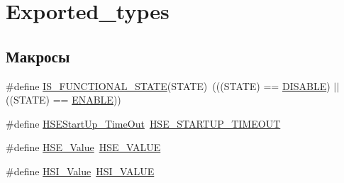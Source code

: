 \hypertarget{group___exported__types}{}\section{Exported\+\_\+types}
\label{group___exported__types}
\subsection*{Макросы}
\begin{DoxyCompactItemize}
\item 
\#define \mbox{\hyperlink{group___exported__types_gaffaf7c3f537d7a3370b1bbdda67a2bf6}{I\+S\+\_\+\+F\+U\+N\+C\+T\+I\+O\+N\+A\+L\+\_\+\+S\+T\+A\+TE}}(S\+T\+A\+TE)~(((S\+T\+A\+TE) == \mbox{\hyperlink{group___exported__types_ggac9a7e9a35d2513ec15c3b537aaa4fba1ad3a9df141be0ccf10389b640f492b26d}{D\+I\+S\+A\+B\+LE}}) $\vert$$\vert$ ((S\+T\+A\+TE) == \mbox{\hyperlink{group___exported__types_ggac9a7e9a35d2513ec15c3b537aaa4fba1a7d46875fa3ebd2c34d2756950eda83bf}{E\+N\+A\+B\+LE}}))
\item 
\#define \mbox{\hyperlink{group___exported__types_ga7e69dacd5c3b950b5b1786d7336b30d3}{H\+S\+E\+Start\+Up\+\_\+\+Time\+Out}}~\mbox{\hyperlink{group___library__configuration__section_ga68ecbc9b0a1a40a1ec9d18d5e9747c4f}{H\+S\+E\+\_\+\+S\+T\+A\+R\+T\+U\+P\+\_\+\+T\+I\+M\+E\+O\+UT}}
\item 
\#define \mbox{\hyperlink{group___exported__types_gab12a1abe6dd0001e7a0487a8b175b28c}{H\+S\+E\+\_\+\+Value}}~\mbox{\hyperlink{group___library__configuration__section_gaeafcff4f57440c60e64812dddd13e7cb}{H\+S\+E\+\_\+\+V\+A\+L\+UE}}
\item 
\#define \mbox{\hyperlink{group___exported__types_ga5718ca1fe0825cdbebb466886cfb5016}{H\+S\+I\+\_\+\+Value}}~\mbox{\hyperlink{group___library__configuration__section_gaaa8c76e274d0f6dd2cefb5d0b17fbc37}{H\+S\+I\+\_\+\+V\+A\+L\+UE}}
\end{DoxyCompactItemize}

